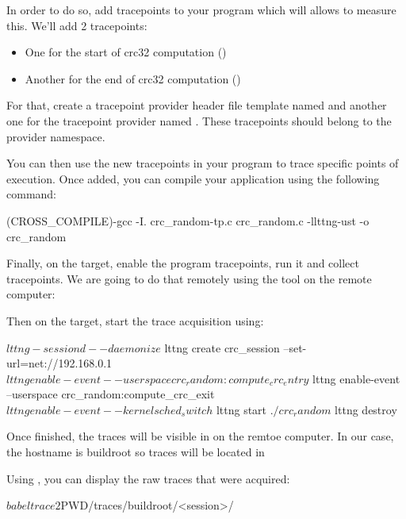 In order to do so, add tracepoints to your program which will allows to measure
this. We'll add 2 tracepoints:

\begin{itemize}
  \item One for the start of crc32 computation ()
  \item Another for the end of crc32 computation ()
\end{itemize}

For that, create a tracepoint provider header file template named
 and another one for the tracepoint provider named
. These tracepoints should belong to the 
provider namespace.

You can then use the new tracepoints in your program to trace specific points
of execution. Once added, you can compile your application using the following
command:

\begin{bashinput}
$ $(CROSS_COMPILE)-gcc -I. crc_random-tp.c crc_random.c  -llttng-ust -o crc_random
\end{bashinput}

Finally, on the target, enable the program tracepoints, run it and collect
tracepoints. We are going to do that remotely using the  tool
on the remote computer:


Then on the target, start the trace acquisition using:

\begin{bashinput}
$ lttng-sessiond --daemonize
$ lttng create crc_session --set-url=net://192.168.0.1
$ lttng enable-event --userspace crc_random:compute_crc_entry
$ lttng enable-event --userspace crc_random:compute_crc_exit
$ lttng enable-event --kernel sched_switch
$ lttng start
$ ./crc_random
$ lttng destroy
\end{bashinput}

Once finished, the traces will be visible in 
on the remtoe computer. In our case, the hostname is buildroot so traces will be
located in 

Using , you can display the raw traces that were acquired:
\begin{bashinput}
$ babeltrace2 $PWD/traces/buildroot/<session>/
\end{bashinput}

